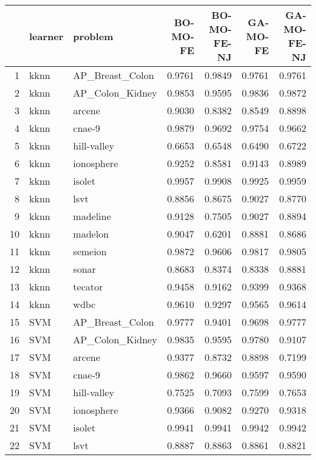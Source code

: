\begin{table}[ht]
\centering
\begin{tabular}{rllrrrr}
  \hline
 & learner & problem & BO-MO-FE & BO-MO-FE-NJ & GA-MO-FE & GA-MO-FE-NJ \\ 
  \hline
1 & kknn & AP\_Breast\_Colon & 0.9761 & 0.9849 & 0.9761 & 0.9761 \\ 
  2 & kknn & AP\_Colon\_Kidney & 0.9853 & 0.9595 & 0.9836 & 0.9872 \\ 
  3 & kknn & arcene & 0.9030 & 0.8382 & 0.8549 & 0.8898 \\ 
  4 & kknn & cnae-9 & 0.9879 & 0.9692 & 0.9754 & 0.9662 \\ 
  5 & kknn & hill-valley & 0.6653 & 0.6548 & 0.6490 & 0.6722 \\ 
  6 & kknn & ionosphere & 0.9252 & 0.8581 & 0.9143 & 0.8989 \\ 
  7 & kknn & isolet & 0.9957 & 0.9908 & 0.9925 & 0.9959 \\ 
  8 & kknn & lsvt & 0.8856 & 0.8675 & 0.9027 & 0.8770 \\ 
  9 & kknn & madeline & 0.9128 & 0.7505 & 0.9027 & 0.8894 \\ 
  10 & kknn & madelon & 0.9047 & 0.6201 & 0.8881 & 0.8686 \\ 
  11 & kknn & semeion & 0.9872 & 0.9606 & 0.9817 & 0.9805 \\ 
  12 & kknn & sonar & 0.8683 & 0.8374 & 0.8338 & 0.8881 \\ 
  13 & kknn & tecator & 0.9458 & 0.9162 & 0.9399 & 0.9368 \\ 
  14 & kknn & wdbc & 0.9610 & 0.9297 & 0.9565 & 0.9614 \\ 
  15 & SVM & AP\_Breast\_Colon & 0.9777 & 0.9401 & 0.9698 & 0.9777 \\ 
  16 & SVM & AP\_Colon\_Kidney & 0.9835 & 0.9595 & 0.9780 & 0.9107 \\ 
  17 & SVM & arcene & 0.9377 & 0.8732 & 0.8898 & 0.7199 \\ 
  18 & SVM & cnae-9 & 0.9862 & 0.9660 & 0.9597 & 0.9590 \\ 
  19 & SVM & hill-valley & 0.7525 & 0.7093 & 0.7599 & 0.7653 \\ 
  20 & SVM & ionosphere & 0.9366 & 0.9082 & 0.9270 & 0.9318 \\ 
  21 & SVM & isolet & 0.9941 & 0.9941 & 0.9942 & 0.9942 \\ 
  22 & SVM & lsvt & 0.8887 & 0.8863 & 0.8861 & 0.8821 \\ 

\end{tabular}
\end{table}
